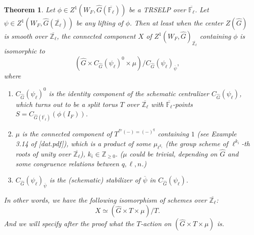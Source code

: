\documentclass{article}
\newcommand{\red}[1]{\textcolor{red}{#1}}
\newcommand{\blue}[1]{\textcolor{blue}{#1}}
\newtheorem{theorem}{Theorem}
\begin{document}
	\begin{theorem}\label{Theorem: X}
		Let $\phi \in Z^1(W_F, \hat{G}(\overline{\mathbb{F}_\ell}))$ be a TRSELP over $\overline{\mathbb{F}_\ell}$. Let $\psi \in Z^1(W_F, \hat{G}(\overline{\mathbb{Z}_\ell}))$ be any lifting of $\phi$. Then at least when the center $Z(\hat{G})$ is smooth over $\overline{\mathbb{Z}_\ell}$, the connected component $X$ of $Z^1(W_F, \hat{G})_{\overline{\mathbb{Z}_\ell}}$ containing $\phi$ is isomorphic to $$(\hat{G} \times C_{\hat{G}}(\psi_{\ell})^0 \times \mu)/C_{\hat{G}}(\psi_{\ell})_{\overline{\psi}},$$ where \begin{enumerate}
			\item $C_{\hat{G}}(\psi_{\ell})^0$ is the identity component of the schematic centralizer $C_{\hat{G}}(\psi_{\ell})$, which turns out to be a split torus $T$ over $\overline{\mathbb{Z}_\ell}$ with $\overline{\mathbb{F}_\ell}$-points $S=C_{\hat{G}(\overline{\mathbb{F}_\ell})}(\phi(I_F))$.
			\item $\mu$ is the connected component of $T^{^{Fr}(-)=(-)^q}$ containing $1$ (see Example 3.14 of [dat.pdf]), which is a product of some $\mu_{\ell^{k_i}}$ (the group scheme of ${\ell^{k_i}}$-th roots of unity over $\overline{\mathbb{Z}_\ell}$), $k_i \in \mathbb{Z}_{\geq 0}$. ($\mu$ could be trivial, depending on $\hat{G}$ and some congruence relations between $q, \ell, n$.)
			\item $C_{\hat{G}}(\psi_{\ell})_{\overline{\psi}}$ is the (schematic) stabilizer %
			of $\overline{\psi}$ in $C_{\hat{G}}(\psi_{\ell})$.
		\end{enumerate}  
		
		In other words, we have the following isomorphism of schemes over $\overline{\mathbb{Z}_\ell}$:
		$$X \simeq (\hat{G} \times T \times \mu)/T.$$ And we will specify after the proof what the $T$-action on $(\hat{G} \times T \times \mu)$ is.
	\end{theorem}
	
\end{document}
